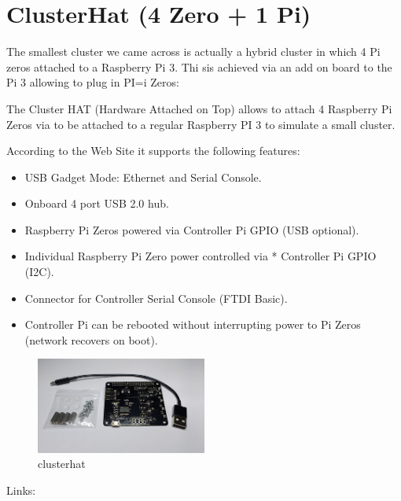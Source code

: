 

\section{ClusterHat (4 Zero + 1 Pi)}\label{clusterhat-4-zero-1-pi}

The smallest cluster we came across is actually a hybrid cluster in
which 4 Pi zeros attached to a Raspberry Pi 3. Thi sis achieved via an
add on board to the Pi 3 allowing to plug in PI=i Zeros:




The Cluster HAT (Hardware Attached on Top) allows to attach 4 Raspberry
Pi Zeros via to be attached to a regular Raspberry PI 3 to simulate a
small cluster.

According to the Web Site it supports the following features:



\begin{itemize}
\item
  USB Gadget Mode: Ethernet and Serial Console.
\item
  Onboard 4 port USB 2.0 hub.
\item
  Raspberry Pi Zeros powered via Controller Pi GPIO (USB optional).
\item
  Individual Raspberry Pi Zero power controlled via * Controller Pi GPIO
  (I2C).
\item
  Connector for Controller Serial Console (FTDI Basic).
\item
  Controller Pi can be rebooted without interrupting power to Pi Zeros
  (network recovers on boot).
\end{itemize}

\begin{figure}
\centering
\includegraphics[width=0.5\textwidth]{images/ClusterHAT-v2-supplied-sm.jpg}
\caption{clusterhat}
\end{figure}



Links:




